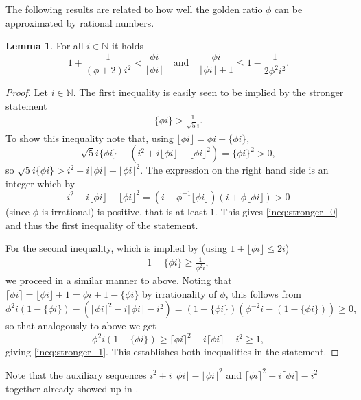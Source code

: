 \documentclass[]{interact}
\newcommand{\bbN}{\mathbb{N}}
\theoremstyle{definition}
\newtheorem{lem}[thm]{Lemma}
\numberwithin{table}{section} %
\numberwithin{figure}{section}
\begin{document}
The following results are related to how well the golden ratio $\phi$ can be approximated by rational numbers.

\begin{lem} \label{lem:floor_ineq}
    For all $i \in \bbN$ it holds
    $$
    1+\frac1{(\phi+2) i^2} < \frac{\phi i}{\lfloor \phi i\rfloor} \quad \text{and} \quad \frac{\phi i}{\lfloor \phi i\rfloor+1} \leq 1 - \frac1{2\phi^2 i^2}.
    $$
\end{lem}
\begin{proof}
    Let $i \in \bbN$. The first inequality is easily seen to be implied by the stronger statement
    \begin{align} \label{ineq:stronger_0}
        \{\phi i\} > \frac1{\sqrt5 i}.
    \end{align}
    To show this inequality note that, using $\lfloor \phi i\rfloor = \phi i - \{\phi i\}$,
    $$
    \sqrt5i\{\phi i\} - (i^2+i\lfloor\phi i\rfloor - \lfloor \phi i\rfloor^2) = \{\phi i\}^2 > 0,
    $$
    so $\sqrt5i\{\phi i\} > i^2+i\lfloor\phi i\rfloor - \lfloor \phi i\rfloor^2$. The expression on the right hand side is an integer which by
    $$
    i^2+i\lfloor\phi i\rfloor - \lfloor \phi i\rfloor^2 = (i-\phi^{-1}\lfloor\phi i\rfloor) (i+\phi\lfloor\phi i\rfloor) > 0
    $$
    (since $\phi$ is irrational) is positive, that is at least $1$. This gives \eqref{ineq:stronger_0} and thus the first inequality of the statement.

    For the second inequality, which is implied by (using $1+\lfloor \phi i\rfloor \leq 2 i$)
    \begin{align} \label{ineq:stronger_1}
        1-\{\phi i\} \geq \frac1{\phi^2 i},
    \end{align}
    we proceed in a similar manner to above. Noting that $\lceil \phi i\rceil = \lfloor\phi i\rfloor + 1 = \phi i + 1 - \{\phi i\}$ by irrationality of $\phi$, this follows from
    $$
    \phi^2 i (1 - \{\phi i\}) - (\lceil \phi i\rceil^2 - i \lceil \phi i\rceil - i^2) = (1-\{\phi i\}) (\phi^{-2} i - (1-\{\phi i\})) \geq 0,
    $$
    so that analogously to above we get
    $$
    \phi^2 i (1 - \{\phi i\}) \geq \lceil \phi i\rceil^2 - i \lceil \phi i\rceil - i^2 \geq 1,
    $$
    giving \eqref{ineq:stronger_1}. This establishes both inequalities in the statement.
\end{proof}

Note that the auxiliary sequences $i^2+i\lfloor\phi i\rfloor - \lfloor \phi i\rfloor^2$ and $\lceil \phi i\rceil^2 - i \lceil \phi i\rceil - i^2$ together already showed up in \cite{Kim075}.
\end{document}
